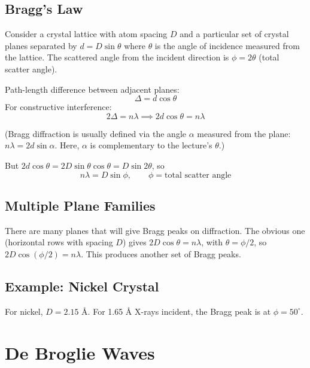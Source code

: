 \documentclass[11pt]{report}
\begin{document}
\subsection*{Bragg's Law}

Consider a crystal lattice with atom spacing $D$ and a particular set of crystal planes separated by $d = D\sin\theta$ where $\theta$ is the angle of incidence measured from the lattice. The scattered angle from the incident direction is $\phi = 2\theta$ (total scatter angle).

Path-length difference between adjacent planes:
\begin{equation}
\Delta = d\cos\theta
\end{equation}
For constructive interference:
\begin{equation}
2\Delta = n\lambda \implies \boxed{2d\cos\theta = n\lambda}
\end{equation}

(Bragg diffraction is usually defined via the angle $\alpha$ measured from the plane: $n\lambda = 2d\sin\alpha$. Here, $\alpha$ is complementary to the lecture's $\theta$.)

But $2d\cos\theta = 2D\sin\theta\cos\theta = D\sin 2\theta$, so
\begin{equation}
\boxed{n\lambda = D\sin\phi, \qquad \phi = \text{total scatter angle}}
\end{equation}

\subsection*{Multiple Plane Families}

There are many planes that will give Bragg peaks on diffraction. The obvious one (horizontal rows with spacing $D$) gives $2D\cos\theta = n\lambda$, with $\theta = \phi/2$, so $2D\cos(\phi/2) = n\lambda$. This produces another set of Bragg peaks.

\subsection*{Example: Nickel Crystal}

For nickel, $D = 2.15$ \AA. For 1.65 \AA{} X-rays incident, the Bragg peak is at $\phi = 50^\circ$.

\section{De Broglie Waves}
\end{document}
